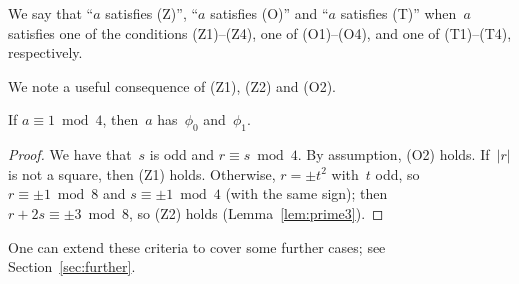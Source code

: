 We say that ``$a$ satisfies (Z)'', ``$a$ satisfies (O)'' and ``$a$ satisfies (T)'' when~$a$
satisfies one of the conditions (Z1)--(Z4), one of (O1)--(O4), and one of (T1)--(T4),
respectively.

We note a useful consequence of (Z1), (Z2) and (O2).

\begin{lemma}
  \label{lem:mod4}
  \leanok
  If $a \equiv 1 \bmod 4$, then~$a$ has~$\phi_0$ and~$\phi_1$.
\end{lemma}
\begin{proof}
  \leanok
  We have that~$s$ is odd and $r \equiv s \bmod 4$. By assumption, (O2) holds. If~$|r|$ is not
  a square, then (Z1) holds. Otherwise, $r = \pm t^2$ with~$t$ odd, so $r \equiv \pm 1 \bmod 8$
  and $s \equiv \pm 1 \bmod 4$ (with the same sign); then $r + 2s \equiv \pm 3 \bmod 8$, so (Z2)
  holds (Lemma~\ref{lem:prime3}).
\end{proof}

One can extend these criteria to cover some further cases; see Section~\ref{sec:further}.
